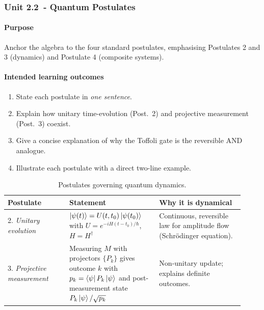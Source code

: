 \vspace{0.5em}

\subsubsection*{Unit 2.2 - Quantum Postulates}

\paragraph{Purpose}  
Anchor the algebra to the four standard postulates, emphasising Postulates 2 and 3 (dynamics) 
and Postulate 4 (composite systems).

\paragraph{Intended learning outcomes}
\begin{enumerate}[label=2.2-\arabic*]
	\item State each postulate in \emph{one sentence}.  
	\item Explain how unitary time-evolution (Post.~2) and projective measurement (Post.~3) coexist.  
	\item Give a concise explanation of why the Toffoli gate is the reversible \textsc{AND} analogue.  
	\item Illustrate each postulate with a direct two-line example.
\end{enumerate}

\begin{table}[h]
	\centering
	\begin{tabular}{p{0.24\linewidth}p{0.35\linewidth}p{0.33\linewidth}}
		\toprule
		\textbf{Postulate} & \textbf{Statement} & \textbf{Why it is dynamical} \\
		\midrule
		2. \emph{Unitary evolution} &
		$\ket{\psi(t)} = U(t,t_{0})\ket{\psi(t_{0})}$ with $U = e^{-iH(t-t_{0})/\hbar}$, $H = H^{\dagger}$ &
		Continuous, reversible law for amplitude flow (Schrödinger equation). \\[4pt]
		3. \emph{Projective measurement} & Measuring $M$ with projectors $\{P_{k}\}$ gives outcome
		$k$ with $p_{k}=\bra{\psi}P_{k}\ket{\psi}$ and post-measurement state $P_{k}\ket{\psi}/\sqrt{p_{k}}$ &
		Non-unitary update; explains definite outcomes. \\
		\bottomrule
	\end{tabular}
	\vspace{4pt}
	\caption{Postulates governing quantum dynamics.}
	\label{tab:postulates}
\end{table}

